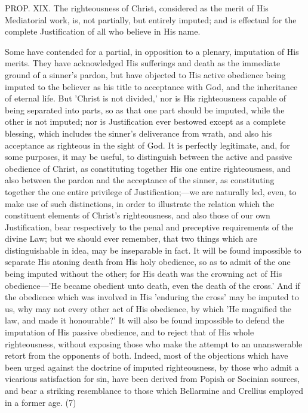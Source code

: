 \documentclass[
]{book}
\begin{document}
PROP. XIX. The righteousness of Christ, considered as the merit of His Mediatorial work, is, not partially, but entirely imputed; and is effectual for the complete Justification of all who believe in His name.

Some have contended for a partial, in opposition to a plenary, imputation of His merits. They have acknowledged His sufferings and death as the immediate ground of a sinner's pardon, but have objected to His active obedience being imputed to the believer as his title to acceptance with God, and the inheritance of eternal life. But 'Christ is not divided,' nor is His righteousness capable of being separated into parts, so as that one part should be imputed, while the other is not imputed; nor is Justification ever bestowed except as a complete blessing, which includes the sinner's deliverance from wrath, and also his acceptance as righteous in the sight of God. It is perfectly legitimate, and, for some purposes, it may be useful, to distinguish between the active and passive obedience of Christ, as constituting together His one entire righteousness, and also between the pardon and the acceptance of the sinner, as constituting together the one entire privilege of Justification;---we are naturally led, even, to make use of such distinctions, in order to illustrate the relation which the constituent elements of Christ's righteousness, and also those of our own Justification, bear respectively to the penal and preceptive requirements of the divine Law; but we should ever remember, that two things which are distinguishable in idea, may be inseparable in fact. It will be found impossible to separate His atoning death from His holy obedience, so as to admit of the one being imputed without the other; for His death was the crowning act of His obedience---'He became obedient unto death, even the death of the cross.' And if the obedience which was involved in His 'enduring the cross' may be imputed to us, why may not every other act of His obedience, by which 'He magnified the law, and made it honourable?' It will also be found impossible to defend the imputation of His passive obedience, and to reject that of His whole righteousness, without exposing those who make the attempt to an unanswerable retort from the opponents of both. Indeed, most of the objections which have been urged against the doctrine of imputed righteousness, by those who admit a vicarious satisfaction for sin, have been derived from Popish or Socinian sources, and bear a striking resemblance to those which Bellarmine and Crellius employed in a former age. (7)
\end{document}
